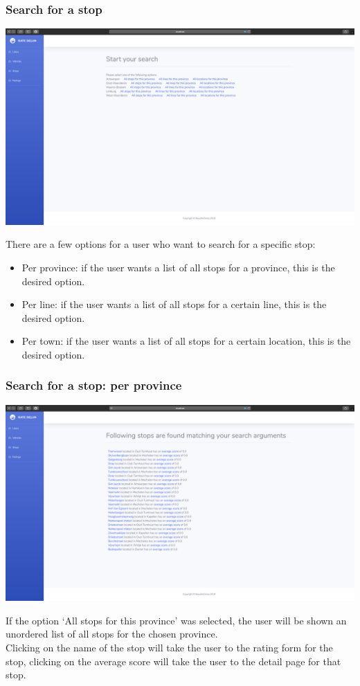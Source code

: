 \documentclass[12pt]{article}
\begin{document}
\subsubsection{Search for a stop}
\begin{center}
	\includegraphics[width=\linewidth]{Images/Start_search.png}
\end{center}
There are a few options for a user who want to search for a specific stop:
\begin{itemize}
	\item Per province: if the user wants a list of all stops for a province, this is the desired option.
	\item Per line: if the user wants a list of all stops for a certain line, this is the desired option.
	\item Per town: if the user wants a list of all stops for a certain location, this is the desired option.
\end{itemize}

\subsubsection{Search for a stop: per province}
\begin{center}
	\includegraphics[width=\linewidth]{Images/Stops_province.png}
\end{center}
If the option `All stops for this province' was selected, the user will be shown an unordered list of all stops for the chosen province.\\
Clicking on the name of the stop will take the user to the rating form for the stop, clicking on the average score will take the user to the detail page for that stop.\\
\end{document}
